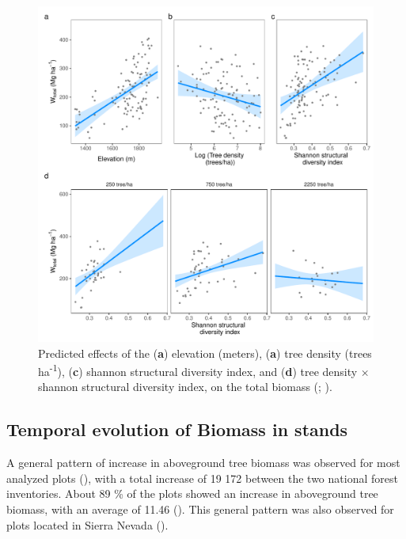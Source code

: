 \begin{figure}
    \centering
    \includegraphics[width=\textwidth]{img/carbon/carbon-glm-effects.pdf}
    \caption{Predicted effects of the (\textbf{a}) elevation (meters), (\textbf{a}) tree density (trees ha\textsuperscript{-1}), (\textbf{c}) shannon structural diversity index, and (\textbf{d}) tree density $\times$ shannon structural diversity index, on the total biomass (\wt; \mgha).}
    \label{fig:carbon:glm}
\end{figure}


\subsection{Temporal evolution of Biomass in \Qp stands}\label{sec:carbon:results-temporal}
A general pattern of increase in aboveground tree biomass was observed for most analyzed plots (), with a total increase of 19 172 \mgha between the two national forest inventories. About 89 \% of the plots showed an increase in aboveground tree biomass, with an average of 11.46 \mgha (). This general pattern was also observed for plots located in Sierra Nevada ().

